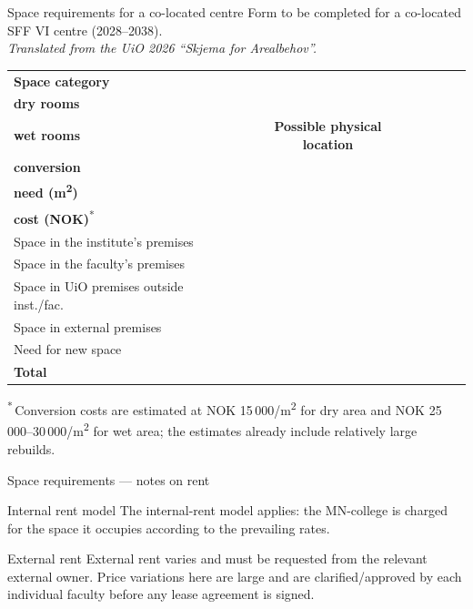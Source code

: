 \documentclass[10pt,aspectratio=169]{beamer}
\begin{document}
\begin{frame}{Space requirements for a co-located centre}
  \small
  Form to be completed for a co-located SFF VI centre (2028--2038).\\[-0.3em]
  {\footnotesize\itshape Translated from the UiO 2026 ``Skjema for Arealbehov''.}
  \vfill
  \begin{table}[h]
  \centering
  \scriptsize
  \setlength{\tabcolsep}{4pt}
  \renewcommand{\arraystretch}{1.9}
  \begin{tabular}{@{}>{\raggedright\arraybackslash}p{3.0cm}cc>{\raggedright\arraybackslash}p{1.9cm}cc@{}}
  \toprule
  \textbf{Space category} &
  \makecell{\textbf{Area (m\textsuperscript{2})}\\\textbf{dry rooms}} &
  \makecell{\textbf{Area (m\textsuperscript{2})}\\\textbf{wet rooms}} &
  \textbf{Possible physical location} &
  \makecell{\textbf{Assumed}\\\textbf{conversion}\\\textbf{need (m\textsuperscript{2})}} &
  \makecell{\textbf{Estimated}\\\textbf{cost (NOK)}\textsuperscript{*}} \\
  \midrule
  Space in the institute's premises          & & & & & \\
  Space in the faculty's premises            & & & & & \\
  Space in UiO premises outside inst./fac.   & & & & & \\
  Space in external premises                 & & & & & \\
  Need for new space                         & & & & & \\
  \textbf{Total}                             & & & & & \\
  \bottomrule
  \end{tabular}
  \end{table}
  \vfill
  {\scriptsize
  \textsuperscript{*}\,Conversion costs are estimated at NOK 15\,000/m\textsuperscript{2} for dry area and
  NOK 25\,000--30\,000/m\textsuperscript{2} for wet area; the estimates already include relatively large rebuilds.}
\end{frame}

\begin{frame}{Space requirements --- notes on rent}
  \begin{block}{Internal rent model}
    The internal-rent model applies: the MN-college is charged for the space it occupies
    according to the prevailing rates.
  \end{block}
  \begin{block}{External rent}
    External rent varies and must be requested from the relevant external owner. Price variations
    here are large and are clarified/approved by each individual faculty before any lease
    agreement is signed.
  \end{block}
\end{frame}
\end{document}
